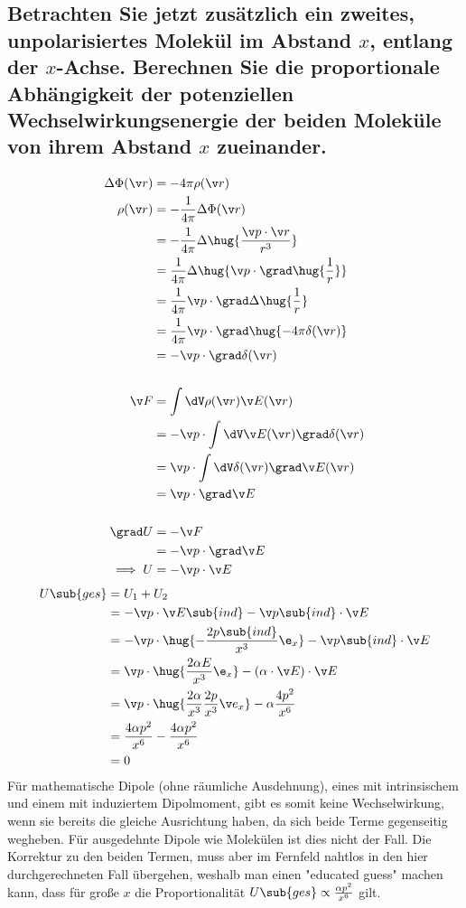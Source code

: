 \documentclass[ex]{exercise_4.1}
\begin{document}
\subsection{Betrachten Sie jetzt zusätzlich ein zweites, unpolarisiertes Molekül im Abstand \(x\), entlang der \(x\)-Achse. Berechnen Sie die proportionale Abhängigkeit der potenziellen Wechselwirkungsenergie der beiden Moleküle von ihrem Abstand \(x\) zueinander.}

\dottedlinett

\begin{align*}
    \Delta \Phi(\v r) &= -4\pi \rho(\v r)\\
    \rho(\v r) &= -\frac{1}{4\pi}\Delta \Phi(\v r)\\
    &= -\frac{1}{4\pi}\Delta \hug{\frac{\v p \cdot \v r }{r^3}}\\
    &= \frac{1}{4\pi}\Delta\hug{\v p\cdot \grad\hug{\frac{1}{r}}}\\
    &= \frac{1}{4\pi}\v p\cdot \grad \Delta \hug{\frac{1}{r}}\\
    &= \frac{1}{4\pi}\v p\cdot \grad \hug{-4\pi \delta(\v r)}\\
    &= -\v p\cdot \grad \delta(\v r)\\
    \\
    \v F 
    &= \int \dV \rho(\v r) \v E(\v r)\\
    &= -\v p\cdot  \int \dV \v E(\v r) \grad \delta(\v r)\\
    &= \v p\cdot  \int \dV \delta(\v r) \grad \v E(\v r) \\
    &= \v p\cdot \grad \v E \\
    \\
    \grad U &= -\v F\\ 
    &= -\v p\cdot \grad \v E\\
    \implies U  &= -\v p \cdot \v E
\end{align*}
\begin{align*}
    U\sub{ges} 
    &= U_1 + U_2\\
    &= -\v p\cdot \v E\sub{ind} -\v p\sub{ind}\cdot \v E\\
    &= -\v p \cdot \hug{-\frac{2p\sub{ind}}{x^3}\e_x} - \v p\sub{ind}\cdot \v E\\
    &= \v p \cdot \hug{\frac{2\alpha E}{x^3}\e_x} - (\alpha \cdot \v E)\cdot \v E\\
    &= \v p \cdot \hug{\frac{2\alpha}{x^3}\frac{2p}{x^3}\v e_x} - \alpha \frac{4p^2}{x^6}\\
    &= \frac{4\alpha p^2}{x^6} - \frac{4\alpha p^2}{x^6}\\
    &= 0
\end{align*}
Für mathematische Dipole (ohne räumliche Ausdehnung), eines mit intrinsischem und einem mit induziertem Dipolmoment, gibt es somit keine Wechselwirkung, wenn sie bereits die gleiche Ausrichtung haben, da sich beide Terme gegenseitig wegheben. Für ausgedehnte Dipole wie Molekülen ist dies nicht der Fall. Die Korrektur zu den beiden Termen, muss aber im Fernfeld nahtlos in den hier durchgerechneten Fall übergehen, weshalb man einen "{}educated guess"{} machen kann, dass für große \(x\) die Proportionalität \(U\sub{ges}\propto \frac{\alpha p^2}{x^6}\) gilt.   
\end{document}

